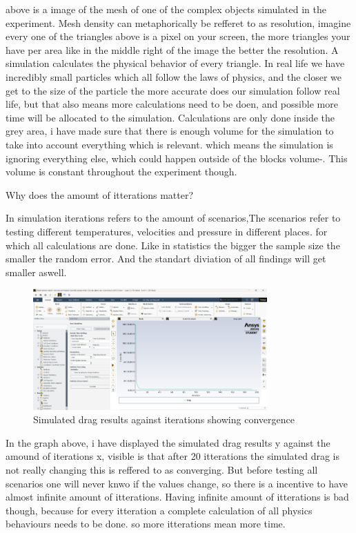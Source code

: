 \documentclass[12pt,a4paper]{article}
\begin{document}
above is a image of the mesh of one of the complex objects simulated in the experiment. Mesh density can metaphorically be refferet to as resolution, imagine every one of the triangles above is a pixel on your screen, the more triangles your have per area like in the middle right of the image the better the resolution. A simulation calculates the physical behavior of every triangle. In real life we have incredibly small particles which all follow the laws of physics, and the closer we get to the size of the particle the more accurate does our simulation follow real life, but that also means more calculations need to be doen, and possible more time will be allocated to the simulation.
Calculations are only done inside the grey area, i have made sure that there is enough volume for the simulation to take into account everything which is relevant. which means the simulation is ignoring everything else, which could happen outside of the blocks volume-. This volume is constant throughout the experiment though.


Why does the amount of itterations matter?

In simulation iterations refers to the amount of scenarios,The scenarios refer to testing different temperatures, velocities and pressure in different places. for which all calculations are done. Like in statistics the bigger the sample size the smaller the random error. And the standart diviation of all findings will get smaller aswell. 

\begin{figure}[H]
\centering
\includegraphics[width=0.8\textwidth]{image8.png}
\caption{Simulated drag results against iterations showing convergence}
\end{figure}

In the graph above, i have displayed the simulated drag results y against the amound of iterations x, visible is that after 20 itterations the simulated drag is not really changing this is reffered to as converging. But before testing all scenarios one will never knwo if the values change, so there is a incentive to have almost infinite amount of itterations. Having infinite amount of itterations is bad though, because for every itteration a complete calculation of all physics behaviours needs to be done. so more itterations mean more time.
\end{document}
